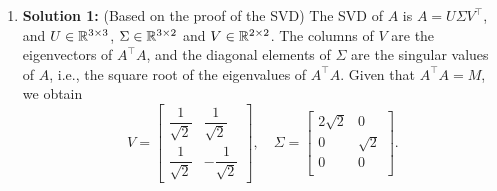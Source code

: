 \documentclass[letterpaper]{article}
\begin{document}
\begin{enumerate}
  \item \textbf{Solution 1:} (Based on the proof of the SVD) The SVD of $A$ is $A=U\Sigma V^\top$, and $U\in\mathbb R^{3\times 3}$,  $\Sigma\in\mathbb R^{3\times 2}$ and $V\in\mathbb R^{2\times 2}$. The columns of $V$ are the eigenvectors of $A^\top A$, and the diagonal elements of $\Sigma$ are the singular values of $A$, i.e., the square root of the eigenvalues of $A^\top A$.
      Given that $A^\top A=M$, we obtain
      \begin{equation*}
        V=\left[  \begin{array}{cc} \dfrac{1}{\sqrt{2}} & \dfrac{1}{\sqrt{2}}\\[5mm] \dfrac{1}{\sqrt{2}} & -\dfrac{1}{\sqrt{2}}\end{array} \right],\quad
        \Sigma =\left[\begin{array}{cc} 2\sqrt{2} & 0 \\ 0& \sqrt{2} \\0 & 0 \\ \end{array} \right].
      \end{equation*}

      \newpage


\end{enumerate}
\end{document}

